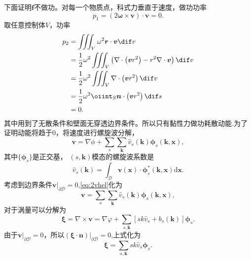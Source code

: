 \documentclass[12pt]{ctexart}
\begin{document}
下面证明$\bm{f}$不做功。对每一个物质点，科式力垂直于速度，做功功率
\begin{equation}
	p_1 = (2 \bm{\omega} \times \bm{v}) \cdot \bm{v} = 0.
\end{equation}
取任意控制体$V$，功率
\begin{equation}
	\begin{aligned}
		p_2 & =  \iiint_V \omega^2\bm{r} \cdot \bm{v} \dif v                                                                          \\
		    & =      \frac{1}{2} \omega^2 \iiint_V \left( \nabla \cdot \left(\bm{v}r^2\right) - r^2 \nabla \cdot \bm{v}\right) \dif v \\
		    & =      \frac{1}{2} \omega^2 \iiint_V \nabla \cdot \left(\bm{v}r^2\right)  \dif v                                        \\
		    & =      \frac{1}{2} \omega^2 \oiint_S \bm{n} \cdot \left(\bm{v}r^2\right)  \dif s                                        \\
		    & =0.
	\end{aligned}
\end{equation}
其中用到了无散条件和壁面无穿透边界条件。所以只有黏性力做功耗散动能.为了证明动能将趋于$0$，将速度进行螺旋波分解，\cite{yang_su_wu_2010}
\begin{equation}
	\bm{v}=\nabla \phi+\sum_{s} \sum_{\bm{k}} \widehat{v}_{s}(\bm{k}) \bm{\phi}_{s}(\bm{k}, \bm{x}),
	\label{eq:2vhel}
\end{equation}
其中$\{\bm{\phi}_{s}\}$是正交基， $(s,\bm{k})$模态的螺旋波系数是
\begin{equation}
	\widehat{v}_{s}(\boldsymbol{k})=\int_{\mathscr{D}} \boldsymbol{v}(\boldsymbol{x}) \cdot \boldsymbol{\phi}_{s}^{*}(\boldsymbol{k}, \boldsymbol{x}) \mathrm{d} \boldsymbol{x}.
\end{equation}
考虑到边界条件$\bm{v}\big|_{\partial \mathscr{D}}=0$,\cref{eq:2vhel}化为
\begin{equation}
	\bm{v}=\sum_{s} \sum_{\bm{k}} \widehat{v}_{s}(\bm{k}) \bm{\phi}_{s}(\bm{k}, \bm{x}),
	\label{eq:2vhel1}
\end{equation}
对于涡量可以分解为
\begin{equation}
	\bm{\xi}=\nabla \times \boldsymbol{v}=\nabla \varphi+\sum_{s, \boldsymbol{k}}\left[s k \widehat{v}_{s}+b_{s}(\boldsymbol{k})\right] \boldsymbol{\phi}_{s}.
\end{equation}
由于$\bm{v}\big|_{\partial \mathscr{D}}=0$，所以$(\bm{\xi}\cdot \bm{n})\big|_{\partial \mathscr{D}}=0$,上式化为
\begin{equation}
	\bm{\xi}=\sum_{s, \boldsymbol{k}}s k \widehat{v}_{s} \boldsymbol{\phi}_{s}.
\end{equation}
\end{document}

